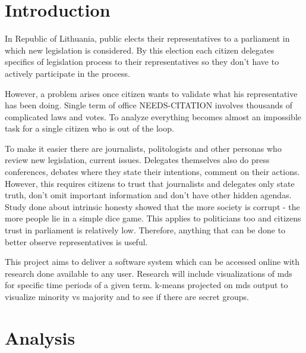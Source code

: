 \documentclass[a4paper,12pt]{article}
\begin{document}
	\clearpage

    \tableofcontents
    
    \clearpage
    
    \printglossary[type=\acronymtype]
    
    \printglossary
    
    \clearpage
    
    
    \section{Introduction}
    
    In Republic of Lithuania, public elects their representatives to a parliament in which new legislation is considered. By this election each citizen delegates specifics of legislation process to their representatives so they don't have to actively participate in the process.
	
	However, a problem arises once citizen wants to validate what his representative has been doing. Single term of office NEEDS-CITATION involves thousands of complicated laws and votes. To analyze everything becomes almost an impossible task for a single citizen who is out of the loop. 
	
	To make it easier there are journalists, politologists and other personas who review new legislation, current issues. Delegates themselves also do press conferences, debates where they state their intentions, comment on their actions. However, this requires citizens to trust that journalists and delegates only state truth, don't omit important information and don't have other hidden agendas. Study done about intrinsic honesty showed that the more society is corrupt - the more people lie in a simple dice game. This applies to politicians too and citizens trust in parliament is relatively low.  Therefore, anything that can be done to better observe representatives is useful.

	This project aims to deliver a software system which can be accessed online with research done available to any user. Research will include visualizations of \acrfull{mds} for specific time periods of a given term. \Gls{k-means} projected on \gls{mds} output to visualize minority vs majority and to see if there are secret groups.
    
    \clearpage
    
    \section{Analysis}
   
\end{document}
